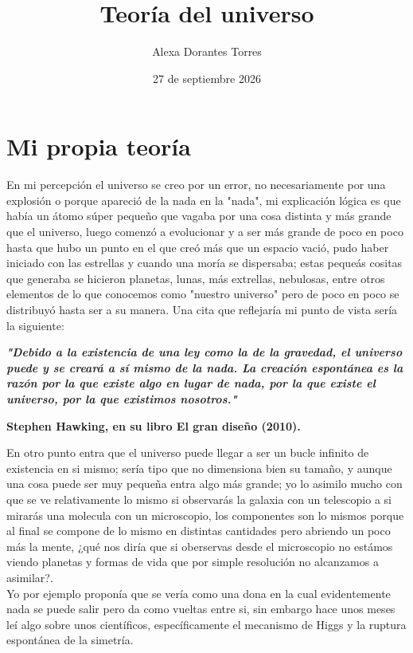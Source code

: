\documentclass{article}
\title{Teoría del universo}
\author{Alexa Dorantes Torres}
\date{27 de septiembre 2026}
\begin{document}
\maketitle

\section{Mi propia teoría}
\maketitle
En mi percepción el universo se creo por un error, no necesariamente por una explosión o porque apareció de la nada en la "nada", mi explicación lógica es que había un átomo súper pequeño que vagaba por una cosa distinta y más grande que el universo, luego comenzó a evolucionar y a ser más grande de poco en poco hasta que hubo un punto en el que creó más que un espacio vació, pudo haber iniciado con las estrellas y cuando una moría se dispersaba; estas pequeás cositas que generaba se hicieron planetas, lunas, más extrellas, nebulosas, entre otros elementos de lo que conocemos como "nuestro universo" pero de poco en poco se distribuyó hasta ser a su manera.
Una cita que reflejaría mi punto de vista sería la siguiente:

\begin{center}
\textbf{\textit{"Debido a la existencia de una ley como la de la gravedad, el universo puede y se creará a sí mismo de la nada. La creación espontánea es la razón por la que existe algo en lugar de nada, por la que existe el universo, por la que existimos nosotros."}} \\
\end{center}

\begin{center} 
\textbf{Stephen Hawking, en su libro El gran diseño (2010).}
\end{center}


En otro punto entra que el universo puede llegar a ser un bucle infinito de existencia en si mismo; sería tipo que no dimensiona bien su tamaño, y aunque una cosa puede ser muy pequeña entra algo más grande; yo lo asimilo mucho con que se ve relativamente lo mismo si observarás la galaxia con un telescopio a si mirarás una molecula con un microscopio, los componentes son lo mismos porque al final se compone de lo mismo en distintas cantidades pero abriendo un poco más la mente, ¿qué nos diría que si oberservas desde el microscopio no estámos viendo planetas y formas de vida que por simple resolución no alcanzamos a asimilar?.\\
Yo por ejemplo proponía que se vería como una dona en la cual evidentemente nada se puede salir pero da como vueltas entre si, sin embargo hace unos meses leí algo sobre unos científicos, específicamente el mecanismo de Higgs y la ruptura espontánea de la simetría.
\end{document}
